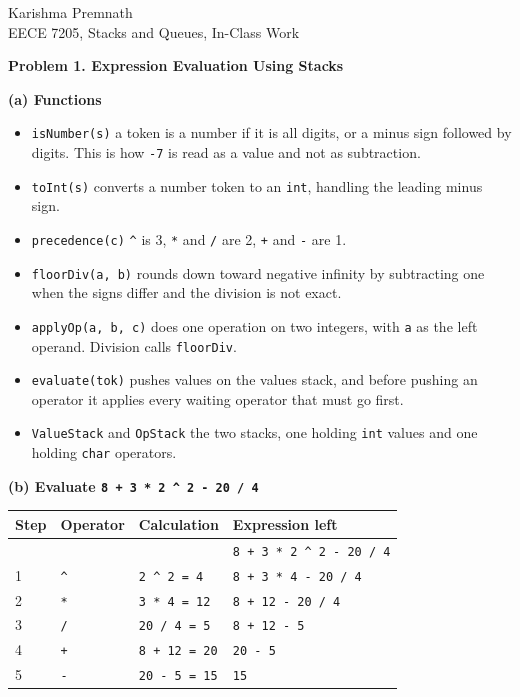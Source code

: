 \documentclass[11pt]{article}
\begin{document}
Karishma Premnath \\
EECE 7205, Stacks and Queues, In-Class Work

\hrulefill

{\large \textbf{Problem 1. Expression Evaluation Using Stacks}}

\textbf{(a) Functions}

\begin{itemize}[leftmargin=*, itemsep=2pt, topsep=2pt]
\item \texttt{isNumber(s)} \quad a token is a number if it is all digits, or a minus sign
      followed by digits. This is how \texttt{-7} is read as a value and not as subtraction.
\item \texttt{toInt(s)} \quad converts a number token to an \texttt{int}, handling the
      leading minus sign.
\item \texttt{precedence(c)} \quad \texttt{\^{}} is 3, \texttt{*} and \texttt{/} are 2,
      \texttt{+} and \texttt{-} are 1.
\item \texttt{floorDiv(a, b)} \quad rounds down toward negative infinity by subtracting one
      when the signs differ and the division is not exact.
\item \texttt{applyOp(a, b, c)} \quad does one operation on two integers, with \texttt{a} as
      the left operand. Division calls \texttt{floorDiv}.
\item \texttt{evaluate(tok)} \quad pushes values on the values stack, and before pushing an
      operator it applies every waiting operator that must go first.
\item \texttt{ValueStack} and \texttt{OpStack} \quad the two stacks, one holding \texttt{int}
      values and one holding \texttt{char} operators.
\end{itemize}

\textbf{(b) Evaluate \texttt{8 + 3 * 2 \^{} 2 - 20 / 4}}

\begin{tabular}{llll}
Step & Operator & Calculation & Expression left \\[2pt]
\hline
    &            &                 & \texttt{8 + 3 * 2 \^{} 2 - 20 / 4} \\
1 & \texttt{\^{}} & \texttt{2 \^{} 2 = 4}   & \texttt{8 + 3 * 4 - 20 / 4} \\
2 & \texttt{*}    & \texttt{3 * 4 = 12}  & \texttt{8 + 12 - 20 / 4} \\
3 & \texttt{/}    & \texttt{20 / 4 = 5}       & \texttt{8 + 12 - 5} \\
4 & \texttt{+}    & \texttt{8 + 12 = 20}      & \texttt{20 - 5} \\
5 & \texttt{-}    & \texttt{20 - 5 = 15}      & \texttt{15} \\
\end{tabular}
\end{document}
